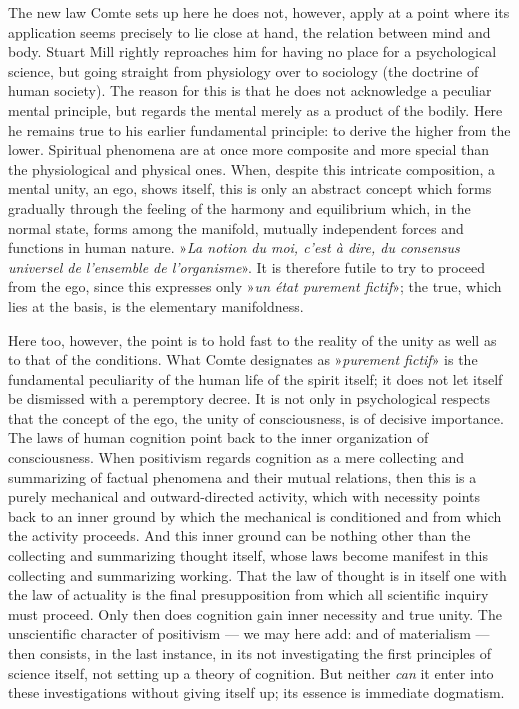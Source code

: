 \documentclass[12pt,a4paper,openany]{book}
\newcommand{\opage}[1]{\marginnote{\footnotesize\textit{[#1]}}}
\begin{document}
The new law Comte sets up here he does not, however,
apply at a point where its application seems precisely to
lie close at hand, the relation between mind and body. Stuart
Mill rightly reproaches him for having no place
for a psychological science, but going straight from physiology
over to sociology (the doctrine of human society).
The reason for this is that he does not acknowledge
a peculiar mental principle, but regards the
mental merely as a product of the bodily. Here he remains
true to his earlier fundamental principle: to derive the
higher from the lower. Spiritual phenomena are at
once more composite and more special than the physiological
and physical ones. When, despite this intricate composition,
a mental unity, an ego, shows itself, this is only an abstract
concept which forms gradually through the feeling of
the harmony and equilibrium which, in the normal state, forms
among the manifold, mutually independent forces
and functions in human nature. »\textit{La notion du
moi, c'est à dire, du consensus universel de l'ensemble de
l'organisme}». It is therefore futile to try to proceed
from the ego, since this expresses only »\textit{un état purement
fictif}»; the true, which lies at the basis, is the elementary
manifoldness.

Here too, however, the point is to hold fast to the reality of the unity
as well as to that of the conditions. What Comte designates
as »\textit{purement fictif}» is the fundamental peculiarity of the human life
of the spirit itself; it does not let itself be dismissed with a
peremptory decree. It is not only in psychological respects that
the concept of the ego, the unity of consciousness, is of decisive importance.
The laws of human cognition point back to
the inner organization of consciousness. When positivism regards
cognition as a mere collecting and summarizing
of factual phenomena and their mutual relations, then
\opage{208}this is a purely mechanical and outward-directed activity, which with
necessity points back to an inner ground by which the
mechanical is conditioned and from which the activity proceeds.
And this inner ground can be nothing other than the
collecting and summarizing thought itself, whose laws become
manifest in this collecting and summarizing working.
That the law of thought is in itself one with the law of actuality is
the final presupposition from which all scientific inquiry
must proceed. Only then does cognition gain inner necessity
and true unity. The unscientific character of positivism --- we may here
add: and of materialism --- then consists, in the
last instance, in its not investigating the first principles of science itself,
not setting up a theory of cognition. But neither
\emph{can} it enter into these investigations without
giving itself up; its essence is immediate dogmatism.
\end{document}

